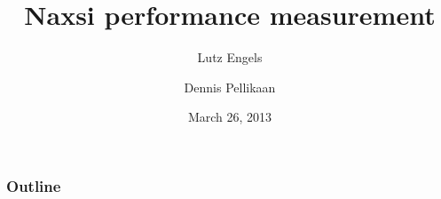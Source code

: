 \documentclass[11pt]{beamer}
\title{Naxsi performance measurement}
\author{Lutz Engels \and Dennis Pellikaan}
\institute[University of Amsterdam] %
{
{\large University of Amsterdam} \\
System and Network Engineering
}
\date{March 26, 2013}
\begin{document}
\begin{frame}
  \titlepage
\end{frame}


\begin{frame}
  \frametitle{Outline}
  \tableofcontents
\end{frame}




\end{document}
